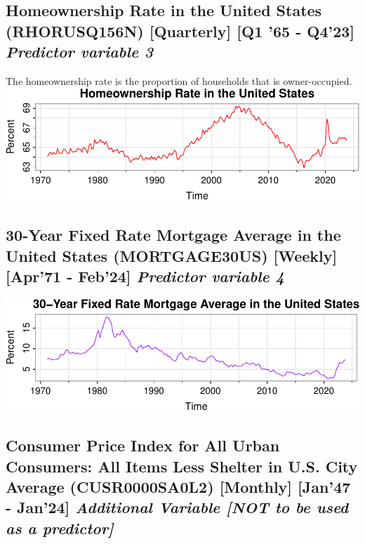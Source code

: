 \documentclass[
  man]{apa6}
\begin{document}
\subsection{\texorpdfstring{Homeownership Rate in the United States (RHORUSQ156N) {[}Quarterly{]} {[}Q1 '65 - Q4'23{]} \emph{Predictor variable 3}}{Homeownership Rate in the United States (RHORUSQ156N) {[}Quarterly{]} {[}Q1 '65 - Q4'23{]} Predictor variable 3}}\label{homeownership-rate-in-the-united-states-rhorusq156n-quarterly-q1-65---q423-predictor-variable-3}

The homeownership rate is the proportion of households that is owner-occupied.
\includegraphics{STAT429Report---Copy_files/figure-latex/unnamed-chunk-5-1.pdf}

\subsection{\texorpdfstring{30-Year Fixed Rate Mortgage Average in the United States (MORTGAGE30US) {[}Weekly{]} {[}Apr'71 - Feb'24{]} \emph{Predictor variable 4}}{30-Year Fixed Rate Mortgage Average in the United States (MORTGAGE30US) {[}Weekly{]} {[}Apr'71 - Feb'24{]} Predictor variable 4}}\label{year-fixed-rate-mortgage-average-in-the-united-states-mortgage30us-weekly-apr71---feb24-predictor-variable-4}

\includegraphics{STAT429Report---Copy_files/figure-latex/unnamed-chunk-6-1.pdf}

\subsection{\texorpdfstring{Consumer Price Index for All Urban Consumers: All Items Less Shelter in U.S. City Average (CUSR0000SA0L2) {[}Monthly{]} {[}Jan'47 - Jan'24{]} \emph{Additional Variable {[}NOT to be used as a predictor{]}}}{Consumer Price Index for All Urban Consumers: All Items Less Shelter in U.S. City Average (CUSR0000SA0L2) {[}Monthly{]} {[}Jan'47 - Jan'24{]} Additional Variable {[}NOT to be used as a predictor{]}}}\label{consumer-price-index-for-all-urban-consumers-all-items-less-shelter-in-u.s.-city-average-cusr0000sa0l2-monthly-jan47---jan24-additional-variable-not-to-be-used-as-a-predictor}
\end{document}
